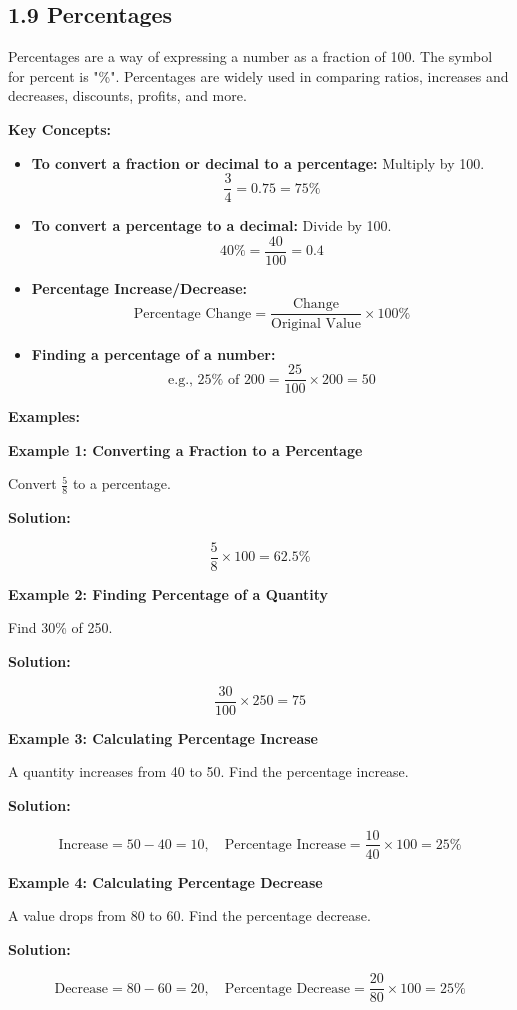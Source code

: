 
\subsection*{1.9 Percentages}

Percentages are a way of expressing a number as a fraction of 100. The symbol for percent is "\%". Percentages are widely used in comparing ratios, increases and decreases, discounts, profits, and more.

\textbf{Key Concepts:}
\begin{itemize}
    \item \textbf{To convert a fraction or decimal to a percentage:} Multiply by 100.
    \[
    \frac{3}{4} = 0.75 = 75\%
    \]
    
    \item \textbf{To convert a percentage to a decimal:} Divide by 100.
    \[
    40\% = \frac{40}{100} = 0.4
    \]

    \item \textbf{Percentage Increase/Decrease:}
    \[
    \text{Percentage Change} = \frac{\text{Change}}{\text{Original Value}} \times 100\%
    \]

    \item \textbf{Finding a percentage of a number:}
    \[
    \text{e.g., } 25\% \text{ of } 200 = \frac{25}{100} \times 200 = 50
    \]
\end{itemize}
\textbf{Examples:}

\begin{flushleft}
\textbf{Example 1: Converting a Fraction to a Percentage}

Convert \( \frac{5}{8} \) to a percentage.

\textbf{Solution:} \vspace{0.2cm}

\[
\frac{5}{8} \times 100 = 62.5\%
\]
\end{flushleft}

\begin{flushleft}
\textbf{Example 2: Finding Percentage of a Quantity}

Find 30\% of 250.

\textbf{Solution:} \vspace{0.2cm}

\[
\frac{30}{100} \times 250 = 75
\]
\end{flushleft}

\begin{flushleft}
\textbf{Example 3: Calculating Percentage Increase}

A quantity increases from 40 to 50. Find the percentage increase.

\textbf{Solution:} \vspace{0.2cm}

\[
\text{Increase} = 50 - 40 = 10, \quad \text{Percentage Increase} = \frac{10}{40} \times 100 = 25\%
\]
\end{flushleft}

\begin{flushleft}
\textbf{Example 4: Calculating Percentage Decrease}

A value drops from 80 to 60. Find the percentage decrease.

\textbf{Solution:} \vspace{0.2cm}

\[
\text{Decrease} = 80 - 60 = 20, \quad \text{Percentage Decrease} = \frac{20}{80} \times 100 = 25\%
\]
\end{flushleft}

